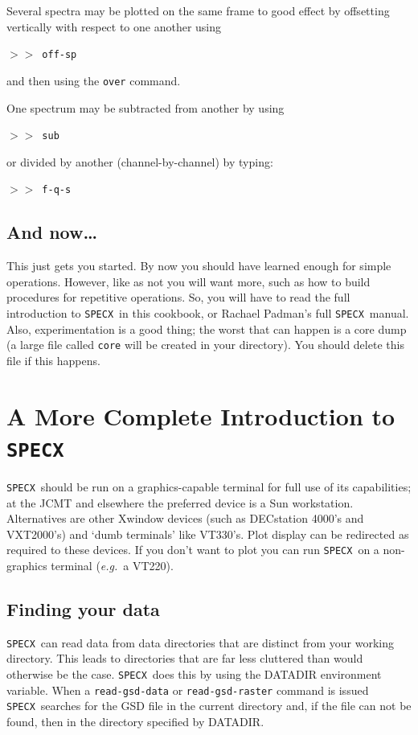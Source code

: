 \documentclass[11pt,twoside]{starlink}
\providecommand{\eg}{\textit{e.g.}}
\providecommand{\SPECX}{\texttt{SPECX}}
\providecommand{\SP}{{$>\!>$}}
\begin{document}
Several spectra may be plotted on the same frame to good effect by
offsetting vertically with respect to one another using

\SP\ \texttt{off-sp}

and then using the \texttt{over} command.

One spectrum may be subtracted from another by using

\SP\ \texttt{sub}

or divided by another (channel-by-channel) by typing:

\SP\ \texttt{f-q-s}

\subsection{And now\ldots}
This just gets you started. By now you should have learned enough for
simple operations. However, like as not you will want more, such as how
to build procedures for repetitive operations. So, you will have to
read the full introduction to \SPECX\ in this cookbook, or Rachael
Padman's full \SPECX\ manual. Also, experimentation is a good thing;
the worst that can happen is a core dump (a large file called \texttt{core} will be created in your directory). You should delete this file
if this happens.


\section{%
A More Complete Introduction to \SPECX }
\label{sec:specx-intro}

\SPECX\ should be run on a graphics-capable terminal for full use of its
capabilities; at the JCMT and elsewhere the preferred device is a Sun
workstation. Alternatives are other Xwindow devices (such as DECstation
4000's and VXT2000's) and `dumb terminals' like VT330's. Plot display
can be redirected as required to these devices. If you don't want to
plot you can run \SPECX\ on a non-graphics terminal (\eg\ a VT220).


\subsection{Finding your data}
\label{sec:finding-the-data}

\SPECX\ can read data from data directories that are distinct from your
working directory. This leads to directories that are far less cluttered than
would otherwise be the case. \SPECX\ does this by using the DATADIR
environment variable. When a \texttt{read-gsd-data} or \texttt{read-gsd-raster}
command is issued \SPECX\ searches for the GSD file in the current directory
and, if the file can not be found, then in the directory specified by
DATADIR.
\end{document}
